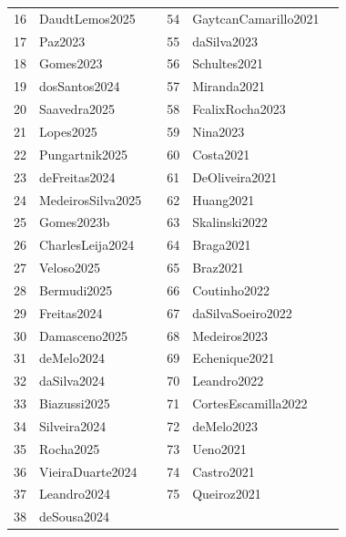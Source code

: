 \documentclass[runningheads]{llncs}
\begin{document}
\begin{table}[htbp]
{\begin{tabular}{rlc rlc}
16 & DaudtLemos2025 & \cite{DaudtLemos2025} & 54 & GaytcanCamarillo2021 & \cite{GaytcanCamarillo2021} \\
17 & Paz2023 & \cite{Paz2023} & 55 & daSilva2023 & \cite{daSilva2023} \\
18 & Gomes2023 & \cite{Gomes2023} & 56 & Schultes2021 & \cite{Schultes2021} \\
19 & dosSantos2024 & \cite{dosSantos2024} & 57 & Miranda2021 & \cite{Miranda2021} \\
20 & Saavedra2025 & \cite{Saavedra2025} & 58 & FcalixRocha2023 & \cite{FcalixRocha2023} \\
21 & Lopes2025 & \cite{Lopes2025} & 59 & Nina2023 & \cite{Nina2023} \\
22 & Pungartnik2025 & \cite{Pungartnik2025} & 60 & Costa2021 & \cite{Costa2021} \\
23 & deFreitas2024 & \cite{deFreitas2024} & 61 & DeOliveira2021 & \cite{DeOliveira2021} \\
24 & MedeirosSilva2025 & \cite{MedeirosSilva2025} & 62 & Huang2021 & \cite{Huang2021} \\
25 & Gomes2023b & \cite{Gomes2023b} & 63 & Skalinski2022 & \cite{Skalinski2022} \\
26 & CharlesLeija2024 & \cite{CharlesLeija2024} & 64 & Braga2021 & \cite{Braga2021} \\
27 & Veloso2025 & \cite{Veloso2025} & 65 & Braz2021 & \cite{Braz2021} \\
28 & Bermudi2025 & \cite{Bermudi2025} & 66 & Coutinho2022 & \cite{Coutinho2022} \\
29 & Freitas2024 & \cite{Freitas2024} & 67 & daSilvaSoeiro2022 & \cite{daSilvaSoeiro2022} \\
30 & Damasceno2025 & \cite{Damasceno2025} & 68 & Medeiros2023 & \cite{Medeiros2023} \\
31 & deMelo2024 & \cite{deMelo2024} & 69 & Echenique2021 & \cite{Echenique2021} \\
32 & daSilva2024 & \cite{daSilva2024} & 70 & Leandro2022 & \cite{Leandro2022} \\
33 & Biazussi2025 & \cite{Biazussi2025} & 71 & CortesEscamilla2022 & \cite{CortesEscamilla2022} \\
34 & Silveira2024 & \cite{Silveira2024} & 72 & deMelo2023 & \cite{deMelo2023} \\
35 & Rocha2025 & \cite{Rocha2025} & 73 & Ueno2021 & \cite{Ueno2021} \\
36 & VieiraDuarte2024 & \cite{VieiraDuarte2024} & 74 & Castro2021 & \cite{Castro2021} \\
37 & Leandro2024 & \cite{Leandro2024} & 75 & Queiroz2021 & \cite{Queiroz2021} \\
38 & deSousa2024 & \cite{deSousa2024} &  & &  \\
\bottomrule
\end{tabular}
}
\end{table}





\end{document}
